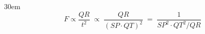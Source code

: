 \documentclass[border=4pt]{standalone}
\begin{document}
\begin{varwidth}{30em}
\large
\[ F \propto \dfrac{QR}{t^2} \;\propto\; \dfrac{QR}{(SP\cdot QT)^2} \;=\; \dfrac{1}{SP^2\cdot QT^2/QR} \]

\end{varwidth}
\end{document}
